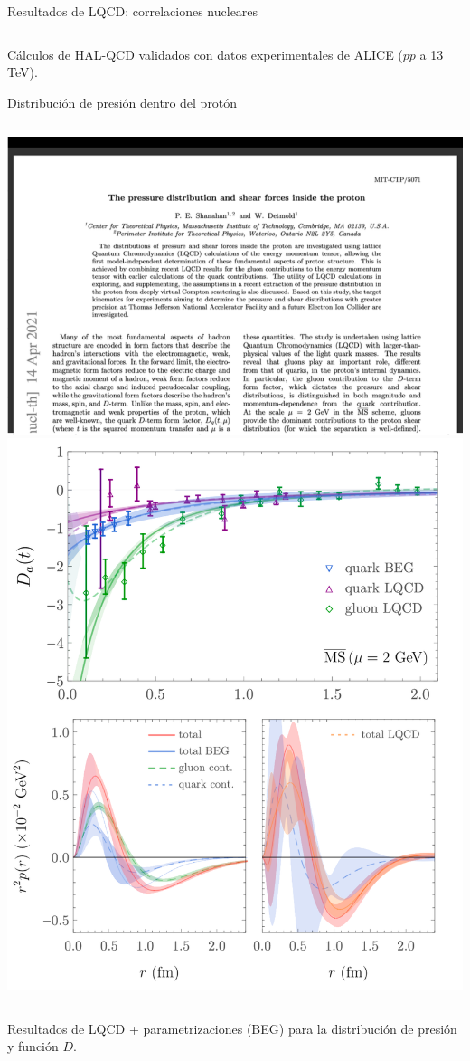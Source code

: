 \documentclass{beamer}
\begin{document}
\begin{frame}{Resultados de LQCD: correlaciones nucleares}
\begin{columns}
  \end{columns}
  \vspace{1em}
  \scriptsize Cálculos de HAL-QCD validados con datos experimentales de ALICE (\( pp \) a 13 TeV).
\end{frame}

\begin{frame}{Distribución de presión dentro del protón}
  \begin{columns}
    \includegraphics[width=\linewidth]{figures/shanahan_pressure_paper.png}
    \includegraphics[width=0.8\linewidth]{figures/shanahan_pressure_plots.png}
  \end{columns}
  \vspace{1em}
  \scriptsize Resultados de LQCD + parametrizaciones (BEG) para la distribución de presión y función \( D \).
\end{frame}
\end{document}
